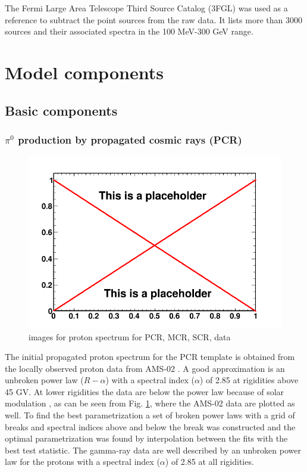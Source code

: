 The Fermi Large Area Telescope Third Source Catalog (3FGL) was used as a reference to subtract the point sources from the raw data. It lists more than 3000 sources and their associated spectra in the 100 MeV-300 GeV range.\\





\section{Model components}
\subsection{Basic components}

\subsubsection{$\pi^0$ production by propagated cosmic rays (PCR)}

\begin{figure}
 \centering
 \includegraphics[width=.9\linewidth]{pic/dummy.png}
 \caption{images for proton spectrum for PCR, MCR, SCR, data}
 \label{fig:proton_spec}
\end{figure}

The initial propagated proton spectrum for the PCR template is obtained from the locally observed proton data from AMS-02 . A good approximation is an unbroken power law ($R-\alpha$) with a spectral index ($\alpha$) of 2.85 at rigidities above 45 GV. At lower rigidities the data are below the power law because of solar modulation , as can be seen from Fig. \ref{fig:proton_spec}, where the AMS-02 data are plotted as well. To find the best parametrization a set of broken power laws with a grid of breaks and spectral indices above and below the break was constructed and the optimal parametrization was found by interpolation between the fits with the best test statistic. 
The gamma-ray data are well described by an unbroken power law for the protons with a spectral index ($\alpha$) of 2.85 at all rigidities.\\

